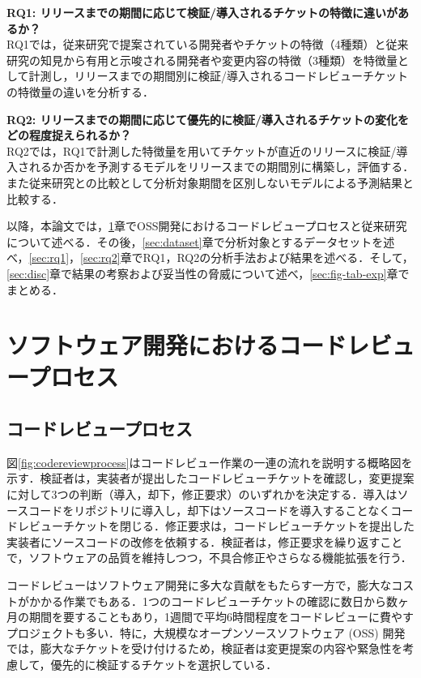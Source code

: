 \documentclass[T,J]{fose} %
\newcommand{\rqone}{リリースまでの期間に応じて検証/導入されるチケットの特徴に違いがあるか？}
\newcommand{\rqtwo}{リリースまでの期間に応じて優先的に検証/導入されるチケットの変化をどの程度捉えられるか？}
\begin{document}
\noindent\textbf{RQ1: \rqone}\\
RQ1では，従来研究\cite{prioritizer}で提案されている開発者やチケットの特徴（4種類）と従来研究\cite{review1}\cite{release_merge}の知見から有用と示唆される開発者や変更内容の特徴（3種類）を特徴量として計測し，リリースまでの期間別に検証/導入されるコードレビューチケットの特徴量の違いを分析する．

\noindent\textbf{RQ2: \rqtwo}\\
RQ2では，RQ1で計測した特徴量を用いてチケットが直近のリリースに検証/導入されるか否かを予測するモデルをリリースまでの期間別に構築し，評価する．また従来研究との比較として分析対象期間を区別しないモデルによる予測結果と比較する．

以降，本論文では，\ref{sec:intro}章でOSS開発におけるコードレビュープロセスと従来研究について述べる．その後，\ref{sec:dataset}章で分析対象とするデータセットを述べ，\ref{sec:rq1}，\ref{sec:rq2}章でRQ1，RQ2の分析手法および結果を述べる．そして，\ref{sec:disc}章で結果の考察および妥当性の脅威について述べ，\ref{sec:fig-tab-exp}章でまとめる．

\section{ソフトウェア開発におけるコードレビュープロセス}\label{sec:intro}

\subsection{コードレビュープロセス}
図\ref{fig:codereviewprocess}はコードレビュー作業の一連の流れを説明する概略図を示す．検証者は，実装者が提出したコードレビューチケットを確認し，変更提案に対して3つの判断（導入，却下，修正要求）のいずれかを決定する．導入はソースコードをリポジトリに導入し，却下はソースコードを導入することなくコードレビューチケットを閉じる．修正要求は，コードレビューチケットを提出した実装者にソースコードの改修を依頼する．検証者は，修正要求を繰り返すことで，ソフトウェアの品質を維持しつつ，不具合修正やさらなる機能拡張を行う．

コードレビューはソフトウェア開発に多大な貢献をもたらす一方で，膨大なコストがかかる作業でもある．1つのコードレビューチケットの確認に数日から数ヶ月の期間を要することもあり，1週間で平均6時間程度をコードレビューに費やすプロジェクトも多い\cite{review2}．特に，大規模なオープンソースソフトウェア (OSS) 開発では，膨大なチケットを受け付けるため，検証者は変更提案の内容や緊急性を考慮して，優先的に検証するチケットを選択している\cite{integrator}．
\end{document}
